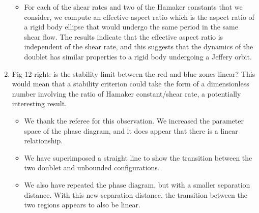 \documentclass[11pt]{article}
\newcommand{\comment}[1]{{\color{blue} #1}}
\begin{document}
\begin{enumerate}
\begin{itemize}
  \item For each of the shear rates and two of the Hamaker constants
    that we consider, we compute an effective aspect ratio which is the
    aspect ratio of a rigid body ellipse that would undergo the same
    period in the same shear flow.  The results indicate that the
    effective aspect ratio is independent of the shear rate, and this
    suggests that the dynamics of the doublet has similar properties to
    a rigid body undergoing a Jeffery orbit. 
\end{itemize}

\item\comment{Fig 12-right: is the stability limit between the red and blue
zones linear? This would mean that a stability criterion could take
the form of a dimensionless number involving the ratio of Hamaker
constant/shear rate, a potentially interesting result.}
\begin{itemize}
  \item We thank the referee for this observation.  We increased the
    parameter space of the phase diagram, and it does appear that there
    is a linear relationship.
  \item We have superimposed a straight line to show the transition
    between the two doublet and unbounded configurations.
  \item We also have repeated the phase diagram, but with a smaller
    separation distance.  With this new separation distance, the
    transition between the two regions appears to also be linear.
\end{itemize}


\end{enumerate}
\end{document}
